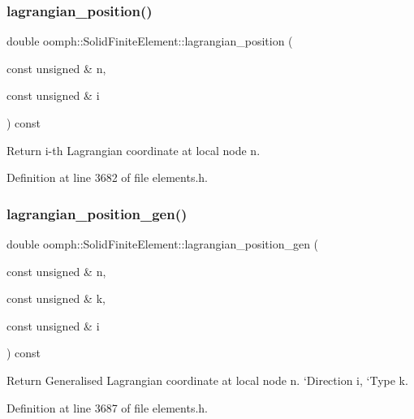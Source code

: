 \subsubsection{\texorpdfstring{lagrangian\+\_\+position()}{lagrangian\_position()}}
{\footnotesize\ttfamily double oomph\+::\+Solid\+Finite\+Element\+::lagrangian\+\_\+position (\begin{DoxyParamCaption}\item[{const unsigned \&}]{n,  }\item[{const unsigned \&}]{i }\end{DoxyParamCaption}) const\hspace{0.3cm}{\ttfamily [inline]}}



Return i-\/th Lagrangian coordinate at local node n. 



Definition at line 3682 of file elements.\+h.

\mbox{\label{classoomph_1_1SolidFiniteElement_a1c49e9ed87230b5e3024442b3a59dfdb}} 
\subsubsection{\texorpdfstring{lagrangian\+\_\+position\+\_\+gen()}{lagrangian\_position\_gen()}}
{\footnotesize\ttfamily double oomph\+::\+Solid\+Finite\+Element\+::lagrangian\+\_\+position\+\_\+gen (\begin{DoxyParamCaption}\item[{const unsigned \&}]{n,  }\item[{const unsigned \&}]{k,  }\item[{const unsigned \&}]{i }\end{DoxyParamCaption}) const\hspace{0.3cm}{\ttfamily [inline]}}



Return Generalised Lagrangian coordinate at local node n. `\+Direction\textquotesingle{} i, `\+Type\textquotesingle{} k. 



Definition at line 3687 of file elements.\+h.



